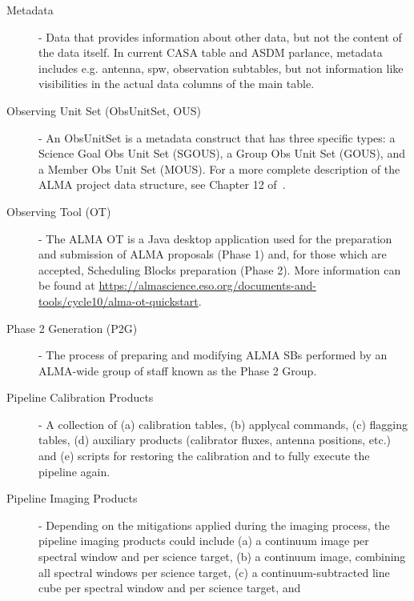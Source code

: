 \begin{description}
\item[Metadata] - Data that provides information about other data, but not the content of the data itself. In current CASA table and ASDM parlance, metadata includes e.g. antenna, spw, observation subtables, but not information like visibilities in the actual data columns of the main table.
\item[Observing Unit Set (ObsUnitSet, OUS)] - An ObsUnitSet is a metadata construct that has three specific types: a Science Goal Obs Unit Set (SGOUS), a Group Obs Unit Set (GOUS), and a Member Obs Unit Set (MOUS). For a more complete description of the ALMA project data structure, see Chapter 12 of~\cite{c12_thb}.
\item[Observing Tool (OT)] - The ALMA OT is a Java desktop application used for the preparation and submission of ALMA proposals (Phase 1) and, for those which are accepted, Scheduling Blocks preparation (Phase 2). 
More information can be found at \url{https://almascience.eso.org/documents-and-tools/cycle10/alma-ot-quickstart}.
\item[Phase 2 Generation (P2G)] - The process of preparing and modifying ALMA SBs performed by an ALMA-wide group of staff known as the Phase 2 Group.
\item[Pipeline Calibration Products] - A collection of (a) calibration tables, (b) applycal commands, (c) flagging tables, (d) auxiliary products (calibrator fluxes, antenna positions, etc.) and (e) scripts for restoring the calibration and to fully execute the pipeline again. 
\item[Pipeline Imaging Products] - Depending on the mitigations applied during the imaging process, the pipeline imaging products could include 
(a) a continuum image per spectral window and per science target,
(b) a continuum image, combining all spectral windows per science target,
(c) a continuum-subtracted line cube per spectral window and per science target, and

\end{description}
